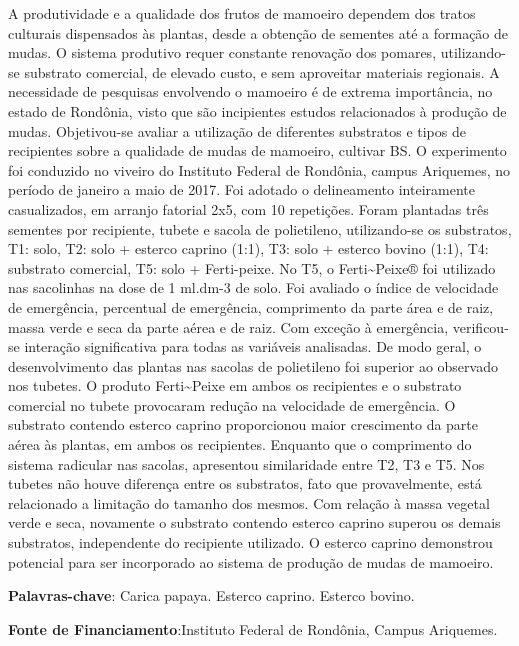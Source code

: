 \documentclass[article,12pt,onesidea,4paper,english,brazil]{abntex2}
\begin{document}
	\noindent A produtividade e a qualidade dos frutos de mamoeiro dependem dos tratos culturais
	dispensados às plantas, desde a obtenção de sementes até a formação de mudas.
	O sistema produtivo requer constante renovação dos pomares, utilizando-se
	substrato comercial, de elevado custo, e sem aproveitar materiais regionais. A
	necessidade de pesquisas envolvendo o mamoeiro é de extrema importância, no
	estado de Rondônia, visto que são incipientes estudos relacionados à produção de
	mudas. Objetivou-se avaliar a utilização de diferentes substratos e tipos de
	recipientes sobre a qualidade de mudas de mamoeiro, cultivar BS. O experimento foi
	conduzido no viveiro do Instituto Federal de Rondônia, campus Ariquemes, no
	período de janeiro a maio de 2017. Foi adotado o delineamento inteiramente
	casualizados, em arranjo fatorial 2x5, com 10 repetições. Foram plantadas três
	sementes por recipiente, tubete e sacola de polietileno, utilizando-se os substratos,
	T1: solo, T2: solo + esterco caprino (1:1), T3: solo + esterco bovino (1:1), T4:
	substrato comercial, T5: solo + Ferti-peixe. No T5, o Ferti\~{}Peixe® foi utilizado nas
	sacolinhas na dose de 1 ml.dm-3 de solo. Foi avaliado o índice de velocidade de
	emergência, percentual de emergência, comprimento da parte área e de raiz, massa
	verde e seca da parte aérea e de raiz. Com exceção à emergência, verificou-se
	interação significativa para todas as variáveis analisadas. De modo geral, o
	desenvolvimento das plantas nas sacolas de polietileno foi superior ao observado
	nos tubetes. O produto Ferti\~{}Peixe em ambos os recipientes e o substrato comercial
	no tubete provocaram redução na velocidade de emergência. O substrato contendo
	esterco caprino proporcionou maior crescimento da parte aérea às plantas, em
	ambos os recipientes. Enquanto que o comprimento do sistema radicular nas
	sacolas, apresentou similaridade entre T2, T3 e T5. Nos tubetes não houve
	diferença entre os substratos, fato que provavelmente, está relacionado a limitação
	do tamanho dos mesmos. Com relação à massa vegetal verde e seca, novamente o
	substrato contendo esterco caprino superou os demais substratos, independente do
	recipiente utilizado. O esterco caprino demonstrou potencial para ser incorporado ao
	sistema de produção de mudas de mamoeiro.
	
	\vspace{\onelineskip}
	
	\noindent
	\textbf{Palavras-chave}: Carica papaya. Esterco caprino. Esterco bovino.
	
	\noindent
	\textbf{Fonte de Financiamento}:Instituto Federal de Rondônia, Campus Ariquemes.
	
\end{document}
